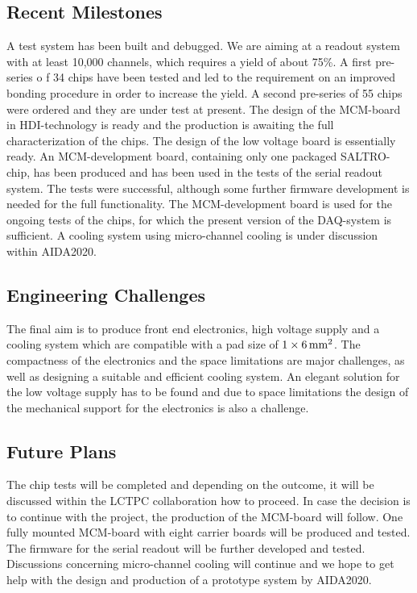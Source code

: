 \subsection{Recent Milestones}
A test system has been built and debugged. We are aiming at a readout system with at least 10,000 channels, which requires a yield of about 75\%. A first pre-series o f 34 chips have been tested and led to the requirement on an improved bonding procedure in order to increase the yield. A second pre-series of 55 chips were ordered and they are under test at present. The design of the MCM-board in HDI-technology is ready and the production is awaiting the full characterization of the chips. The design of the low voltage board is essentially ready. An MCM-development board, containing only one packaged SALTRO-chip, has been produced and has been used in the tests of the serial readout system. The tests were successful, although some further firmware development is needed for the full functionality. The MCM-development board is used for the ongoing tests of the chips, for which the present version of the DAQ-system is sufficient. A cooling system using micro-channel cooling is under discussion within AIDA2020.

\subsection{Engineering Challenges}
The final aim is to produce front end electronics, high voltage supply and a cooling system which are compatible with a pad size of $1 \times \unit[6]{mm^2}$. The compactness of the electronics and the space limitations are major challenges, as well as designing a suitable and efficient cooling system. An elegant solution for the low voltage supply has to be found and due to space limitations the design of the mechanical support for the electronics is also a challenge.

\subsection{Future Plans}
The chip tests will be completed and depending on the outcome, it will be discussed within the LCTPC collaboration how to proceed. In case the decision is to continue with the project, the production of the MCM-board will follow. One fully mounted MCM-board with eight carrier boards will be produced and tested. The firmware for the serial readout will be further developed and tested. Discussions concerning micro-channel cooling will continue and we hope to get help with the design and production of a prototype system by AIDA2020.

